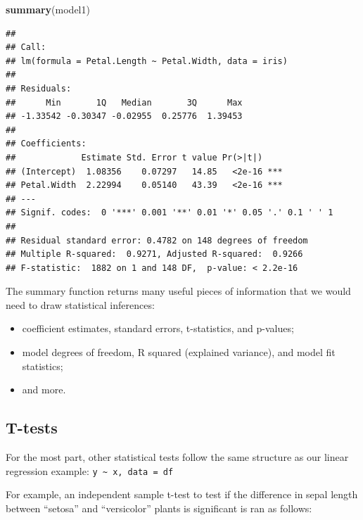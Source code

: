 \documentclass[
]{book}
\newenvironment{Shaded}{\begin{snugshade}}{\end{snugshade}}
\newcommand{\AttributeTok}[1]{\textcolor[rgb]{0.13,0.29,0.53}{#1}}
\newcommand{\FunctionTok}[1]{\textcolor[rgb]{0.13,0.29,0.53}{\textbf{#1}}}
\newcommand{\NormalTok}[1]{#1}
\newcommand{\OtherTok}[1]{\textcolor[rgb]{0.56,0.35,0.01}{#1}}
\newcommand{\SpecialCharTok}[1]{\textcolor[rgb]{0.81,0.36,0.00}{\textbf{#1}}}
\newcommand{\StringTok}[1]{\textcolor[rgb]{0.31,0.60,0.02}{#1}}
\begin{document}
\begin{Shaded}
\begin{Highlighting}[]
\FunctionTok{summary}\NormalTok{(model1)}
\end{Highlighting}
\end{Shaded}

\begin{verbatim}
## 
## Call:
## lm(formula = Petal.Length ~ Petal.Width, data = iris)
## 
## Residuals:
##      Min       1Q   Median       3Q      Max 
## -1.33542 -0.30347 -0.02955  0.25776  1.39453 
## 
## Coefficients:
##             Estimate Std. Error t value Pr(>|t|)    
## (Intercept)  1.08356    0.07297   14.85   <2e-16 ***
## Petal.Width  2.22994    0.05140   43.39   <2e-16 ***
## ---
## Signif. codes:  0 '***' 0.001 '**' 0.01 '*' 0.05 '.' 0.1 ' ' 1
## 
## Residual standard error: 0.4782 on 148 degrees of freedom
## Multiple R-squared:  0.9271, Adjusted R-squared:  0.9266 
## F-statistic:  1882 on 1 and 148 DF,  p-value: < 2.2e-16
\end{verbatim}

The summary function returns many useful pieces of information that we would need to draw statistical inferences:

\begin{itemize}
\item
  coefficient estimates, standard errors, t-statistics, and p-values;
\item
  model degrees of freedom, R squared (explained variance), and model fit statistics;
\item
  and more.
\end{itemize}

\subsection{T-tests}\label{t-tests}

For the most part, other statistical tests follow the same structure as our linear regression example: \texttt{y\ \textasciitilde{}\ x,\ data\ =\ df}

For example, an independent sample t-test to test if the difference in sepal length between ``setosa'' and ``versicolor'' plants is significant is ran as follows:

\begin{Shaded}
\end{Shaded}
\end{document}
